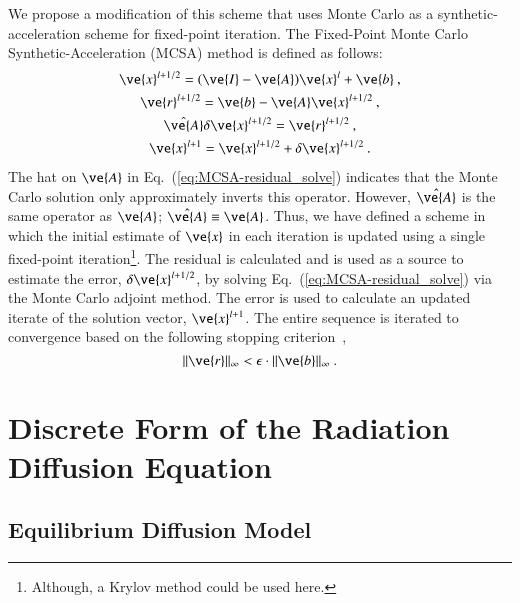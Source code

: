 \documentclass[preprint,12pt]{elsarticle}
\newcommand{\vA}{\ensuremath{\ve{A}}}
\newcommand{\vb}{\ensuremath{\ve{b}}}
\newcommand{\vx}{\ensuremath{\ve{x}}}
\newcommand{\vr}{\ensuremath{\ve{r}}}
\newcommand{\vI}{\ensuremath{\ve{I}}}
\begin{document}
We propose a modification of this scheme that uses Monte Carlo as a
synthetic-acceleration scheme for fixed-point iteration. The
Fixed-Point Monte Carlo Synthetic-Acceleration (MCSA) method is
defined as follows:
\begin{subequations}
  \begin{gather}
    \vx^{l+1/2} = (\vI - \vA)\vx^l + \vb\:, \\
    \vr^{l+1/2} = \vb - \vA\vx^{l+1/2}\:,\\
    \hat{\vA}\delta\vx^{l+1/2} = \vr^{l+1/2}\:,
    \label{eq:MCSA-residual_solve}\\ 
    \vx^{l+1}=\vx^{l+1/2}+\delta\vx^{l+1/2}\:.
  \end{gather}
  \label{eq:general-MCSA}
\end{subequations}
The hat on $\vA$ in Eq.~(\ref{eq:MCSA-residual_solve}) indicates that
the Monte Carlo solution only approximately inverts this operator.
However, $\hat{\vA}$ is the same operator as $\vA$;
$\hat{\vA}\equiv\vA$.  Thus, we have defined a scheme in which the
initial estimate of $\vx$ in each iteration is updated using a single
fixed-point iteration\footnote{Although, a Krylov method could be used
  here.}.  The residual is calculated and is used as a source to
estimate the error, $\delta\vx^{l+1/2}$, by solving
Eq.~(\ref{eq:MCSA-residual_solve}) via the Monte Carlo adjoint method.
The error is used to calculate an updated iterate of the solution
vector, $\vx^{l+1}$.  The entire sequence is iterated to convergence
based on the following stopping criterion~\cite{kelley_1995},
\begin{equation}
  \|\vr\|_{\infty} < \epsilon\cdot\|\vb\|_\infty\:.
  \label{eq:stopping-criteria}
\end{equation}

\section{Discrete Form of the Radiation Diffusion Equation}
\label{sec:discr-form-radi}

\subsection{Equilibrium Diffusion Model}
\end{document}
